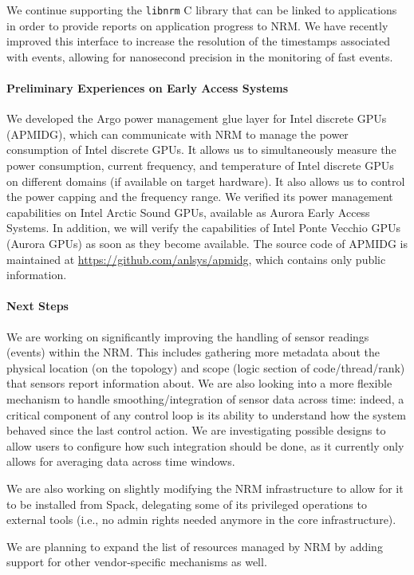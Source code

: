We continue supporting the \texttt{libnrm} C library that can be linked to
applications in order to provide reports on application progress to NRM. We
have recently improved this interface to increase the resolution of the
timestamps associated with events, allowing for nanosecond precision in the
monitoring of fast events.

\paragraph{Preliminary Experiences on Early Access Systems}

We developed the Argo power management glue layer for Intel discrete GPUs
(APMIDG), which can communicate with NRM to manage the power consumption of
Intel discrete GPUs. It allows us to simultaneously measure the power
consumption, current frequency, and temperature of Intel discrete GPUs on
different domains (if available on target hardware). It also allows us to
control the power capping and the frequency range. We verified its power
management capabilities on Intel Arctic Sound GPUs, available as Aurora
Early Access Systems. In addition, we will verify the capabilities of Intel
Ponte Vecchio GPUs (Aurora GPUs) as soon as they become available. The
source code of APMIDG is maintained at \url{https://github.com/anlsys/apmidg},
which contains only public information.

\paragraph{Next Steps}

We are working on significantly improving the handling of sensor readings
(events) within the NRM. This includes gathering more metadata about the
physical location (on the topology) and scope (logic section of
code/thread/rank) that sensors report information about. We are also
looking into a more flexible mechanism to handle smoothing/integration of
sensor data across time: indeed, a critical component of any control loop
is its ability to understand how the system behaved since the last control
action. We are investigating possible designs to allow users to configure
how such integration should be done, as it currently only allows for
averaging data across time windows.

We are also working on slightly modifying the NRM infrastructure to allow
for it to be installed from Spack, delegating some of its privileged
operations to external tools (i.e., no admin rights needed anymore in the
core infrastructure).

We are planning to expand the list of resources managed by NRM by adding
support for other vendor-specific mechanisms as well.

